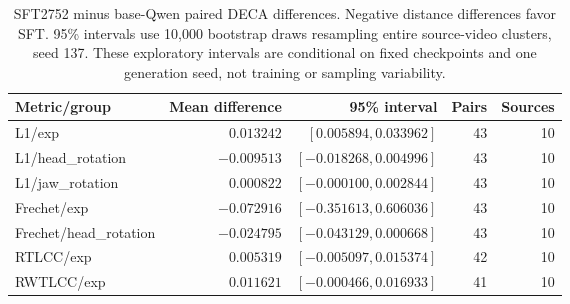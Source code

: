 \begin{table}[t]
\centering\small
\caption{SFT2752 minus base-Qwen paired DECA differences. Negative distance differences favor SFT. 95\% intervals use 10,000 bootstrap draws resampling entire source-video clusters, seed 137. These exploratory intervals are conditional on fixed checkpoints and one generation seed, not training or sampling variability.}
\label{tab:vico43-paired}
\setlength{\tabcolsep}{4pt}
\begin{tabular}{lrrrr}
\toprule
Metric/group & Mean difference & 95\% interval & Pairs & Sources \\
\midrule
L1/exp & $0.013242$ & $[0.005894, 0.033962]$ & 43 & 10 \\
L1/head\_rotation & $-0.009513$ & $[-0.018268, 0.004996]$ & 43 & 10 \\
L1/jaw\_rotation & $0.000822$ & $[-0.000100, 0.002844]$ & 43 & 10 \\
Frechet/exp & $-0.072916$ & $[-0.351613, 0.606036]$ & 43 & 10 \\
Frechet/head\_rotation & $-0.024795$ & $[-0.043129, 0.000668]$ & 43 & 10 \\
RTLCC/exp & $0.005319$ & $[-0.005097, 0.015374]$ & 42 & 10 \\
RWTLCC/exp & $0.011621$ & $[-0.000466, 0.016933]$ & 41 & 10 \\
\bottomrule
\end{tabular}
\end{table}

